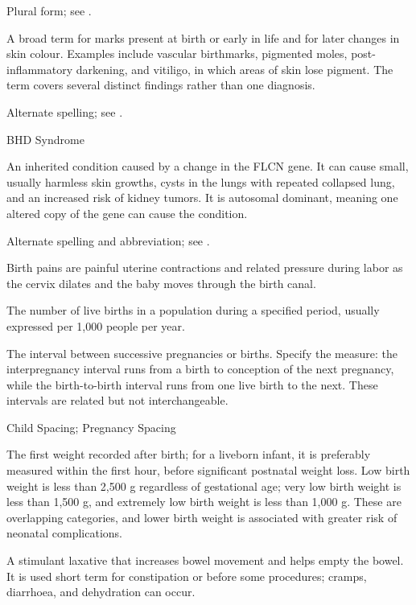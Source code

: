 Plural form; see .

 A broad term for marks present at birth or early in life and for later changes in skin colour. Examples include vascular birthmarks, pigmented moles, post-inflammatory darkening, and vitiligo, in which areas of skin lose pigment. The term covers several distinct findings rather than one diagnosis.

 Alternate spelling; see .

\synonyms
BHD Syndrome

 An inherited condition caused by a change in the FLCN gene. It can cause small, usually harmless skin growths, cysts in the lungs with repeated collapsed lung, and an increased risk of kidney tumors. It is autosomal dominant, meaning one altered copy of the gene can cause the condition.

 Alternate spelling and abbreviation; see .

 Birth pains are painful uterine contractions and related pressure during labor as the cervix dilates and the baby moves through the birth canal.

 The number of live births in a population during a specified period, usually expressed per 1,000 people per year.

 The interval between successive pregnancies or births. Specify the measure: the interpregnancy interval runs from a birth to conception of the next pregnancy, while the birth-to-birth interval runs from one live birth to the next. These intervals are related but not interchangeable.

\synonyms
Child Spacing; Pregnancy Spacing

 The first weight recorded after birth; for a liveborn infant, it is preferably measured within the first hour, before significant postnatal weight loss. Low birth weight is less than 2,500 g regardless of gestational age; very low birth weight is less than 1,500 g, and extremely low birth weight is less than 1,000 g. These are overlapping categories, and lower birth weight is associated with greater risk of neonatal complications.

 A stimulant laxative that increases bowel movement and helps empty the bowel. It is used short term for constipation or before some procedures; cramps, diarrhoea, and dehydration can occur.

